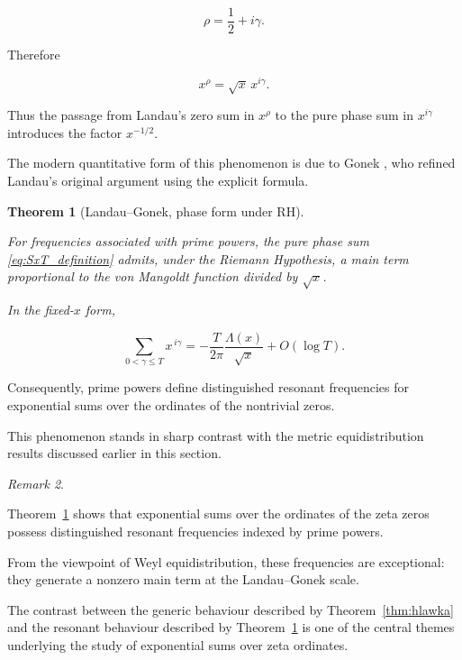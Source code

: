 \documentclass[11pt]{amsart}
\numberwithin{equation}{section}
\theoremstyle{plain}
\newtheorem{theorem}{Theorem}[section]
\theoremstyle{definition}
\theoremstyle{remark}
\newtheorem{remark}[theorem]{Remark}
\begin{document}
\begin{equation}
\rho
=
\frac{1}{2}
+
i\gamma.
\label{eq:RH_zero_decomposition}
\end{equation}

Therefore

\begin{equation}
x^\rho
=
\sqrt{x}\,x^{i\gamma}.
\label{eq:xrho_phase_decomposition}
\end{equation}

Thus the passage from Landau's zero sum in \(x^\rho\) to the pure phase
sum in \(x^{i\gamma}\) introduces the factor \(x^{-1/2}\).


The modern quantitative form of this phenomenon is due to Gonek
\cite{Gonek1993},
who refined Landau's original argument using the explicit formula.

\begin{theorem}[Landau--Gonek, phase form under RH]
\label{thm:landau_gonek_formula}

For frequencies associated with prime powers,
the pure phase sum \eqref{eq:SxT_definition} admits, under the Riemann
Hypothesis, a main term proportional to the von Mangoldt function
divided by \(\sqrt{x}\).

In the fixed-\(x\) form,

\begin{equation}
\sum_{0<\gamma\le T}
x^{\,i\gamma}
=
-
\frac{T}{2\pi}
\frac{\Lambda(x)}{\sqrt{x}}
+
O(\log T).
\label{eq:landau_gonek_asymptotic}
\end{equation}

\end{theorem}

Consequently,
prime powers define distinguished resonant frequencies for exponential
sums over the ordinates of the nontrivial zeros.

This phenomenon stands in sharp contrast with the metric
equidistribution results discussed earlier in this section.

\begin{remark}
\label{rem:prime_power_resonances}

Theorem~\ref{thm:landau_gonek_formula} shows that exponential sums over
the ordinates of the zeta zeros possess distinguished resonant
frequencies indexed by prime powers.

From the viewpoint of Weyl equidistribution,
these frequencies are exceptional:
they generate a nonzero main term at the Landau--Gonek scale.

The contrast between the generic behaviour described by
Theorem~\ref{thm:hlawka}
and the resonant behaviour described by
Theorem~\ref{thm:landau_gonek_formula}
is one of the central themes underlying the study of exponential sums
over zeta ordinates.

\end{remark}
\end{document}
